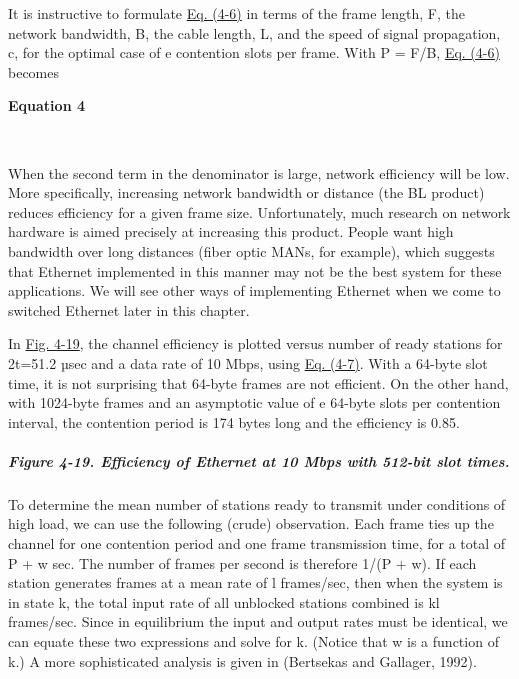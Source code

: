 \documentclass[b5paper,11pt]{memoir}
\begin{document}
It is instructive to formulate
\protect\hyperlink{0130661023_ch04lev1sec3.htmlux5cux23ch04eq06}{Eq.
(4-6)} in terms of the frame length, {F}, the network bandwidth, {B},
the cable length, {L}, and the speed of signal propagation, {c}, for the
optimal case of {e} contention slots per frame. With {P} = {F/B},
\protect\hyperlink{0130661023_ch04lev1sec3.htmlux5cux23ch04eq06}{Eq.
(4-6)} becomes

\textbf{\protect\hypertarget{0130661023_ch04lev1sec3.htmlux5cux23ch04eq07}{}{}
Equation 4}


~

When the second term in the denominator is large, network efficiency
will be low. More specifically, increasing network bandwidth or distance
(the {BL} product) reduces efficiency for a given frame size.
Unfortunately, much research on network hardware is aimed precisely at
increasing this product. People want high bandwidth over long distances
(fiber optic MANs, for example), which suggests that Ethernet
implemented in this manner may not be the best system for these
applications. We will see other ways of implementing Ethernet when we
come to switched Ethernet later in this chapter.

In
\protect\hyperlink{0130661023_ch04lev1sec3.htmlux5cux23ch04fig19}{Fig.
4-19}, the channel efficiency is plotted versus number of ready stations
for 2{t}=51.2 µsec and a data rate of 10 Mbps, using
\protect\hyperlink{0130661023_ch04lev1sec3.htmlux5cux23ch04eq07}{Eq.
(4-7)}. With a 64-byte slot time, it is not surprising that 64-byte
frames are not efficient. On the other hand, with 1024-byte frames and
an asymptotic value of {e} 64-byte slots per contention interval, the
contention period is 174 bytes long and the efficiency is 0.85.

\subparagraph[Figure 4-19. Efficiency of Ethernet at 10 Mbps with
512-bit slot
times.]{\texorpdfstring{\protect\hypertarget{0130661023_ch04lev1sec3.htmlux5cux23ch04fig19}{}{}Figure
4-19. Efficiency of Ethernet at 10 Mbps with 512-bit slot
times.}{Figure 4-19. Efficiency of Ethernet at 10 Mbps with 512-bit slot times.}}


To determine the mean number of stations ready to transmit under
conditions of high load, we can use the following (crude) observation.
Each frame ties up the channel for one contention period and one frame
transmission time, for a total of {P} + {w} sec. The number of frames
per second is therefore 1{/}({P} + {w}){.} If each station generates
frames at a mean rate of {l} frames/sec, then when the system is in
state {k}, the total input rate of all unblocked stations combined is
{k}{l} frames/sec. Since in equilibrium the input and output rates must
be identical, we can equate these two expressions and solve for {k.}
(Notice that {w} is a function of {k.}) A more sophisticated analysis is
given in (Bertsekas and Gallager, 1992).
\end{document}
